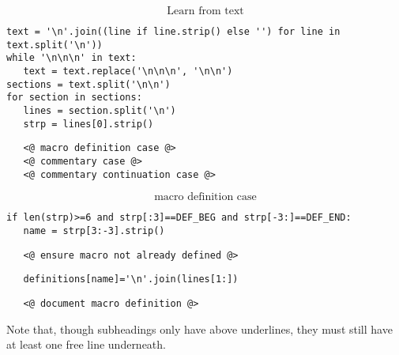 \documentclass{article}
\begin{document}
$$\boxed{\text{Learn from text}}$${\color{YellowOrange}\begin{verbatim}text = '\n'.join((line if line.strip() else '') for line in text.split('\n'))
while '\n\n\n' in text:
   text = text.replace('\n\n\n', '\n\n')
sections = text.split('\n\n')
for section in sections:
   lines = section.split('\n')
   strp = lines[0].strip()
\end{verbatim}}{\color{MidnightBlue}\begin{verbatim}   <@ macro definition case @>
   <@ commentary case @>
   <@ commentary continuation case @>
\end{verbatim}}$$\boxed{\text{macro definition case}}$${\color{YellowOrange}\begin{verbatim}if len(strp)>=6 and strp[:3]==DEF_BEG and strp[-3:]==DEF_END:
   name = strp[3:-3].strip()
\end{verbatim}}{\color{MidnightBlue}\begin{verbatim}   <@ ensure macro not already defined @>
\end{verbatim}}{\color{YellowOrange}\begin{verbatim}   definitions[name]='\n'.join(lines[1:])
\end{verbatim}}{\color{MidnightBlue}\begin{verbatim}   <@ document macro definition @>
\end{verbatim}}Note that, though subheadings only have above underlines, they must still have
at least one free line underneath.
\end{document}
